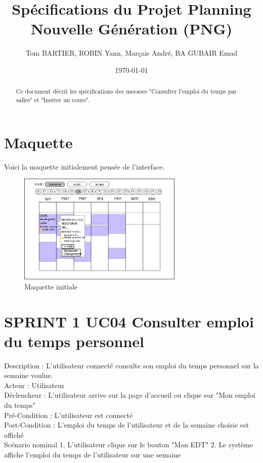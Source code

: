 \documentclass[12pt,a4paper]{article}
\title{Spécifications du Projet Planning Nouvelle Génération (PNG)}
\author{Tom BARTIER, ROBIN Yann, Marçais André, BA GUBAIR Emad}
\date{\today}
\begin{document}
\maketitle

\begin{abstract}
    Ce document décrit les spécifications des usecases "Consulter l'emploi du temps par salles" et 
    "Insérer un cours".
\end{abstract}

\section{Maquette}
Voici la maquette initialement pensée de l'interface.

\begin{figure}[h]
    \centering
    \includegraphics[width=0.7\textwidth]{gui-schema.png}
    \caption{Maquette initiale}
    \label{fig:maquette}
\end{figure}

\section{SPRINT 1 UC04 Consulter emploi du temps personnel}
Description : L'utilisateur connecté consulte son emploi du temps personnel sur la semaine voulue.\\
Acteur : Utilisateur \\
Déclencheur : L'utilisateur arrive sur la page d'accueil ou clique sur "Mon emploi du temps"\\
Pré-Condition : L'utilisateur est connecté\\
Post-Condition : L'emploi du temps de l'utilisateur et de la semaine choisie est affiché\\

Scénario nominal
1. L'utilisateur clique sur le bouton "Mon EDT"
2. Le système affiche l'emploi du temps de l'utilisateur sur une semaine
\end{document}
